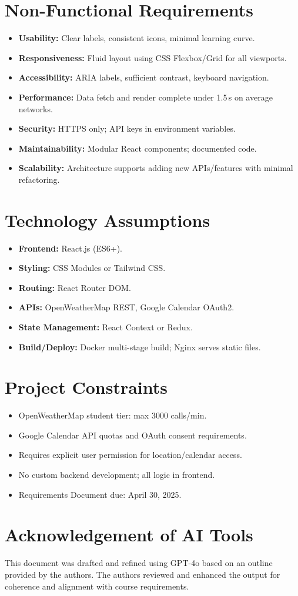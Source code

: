 \documentclass[12pt,a4paper]{article}
\begin{document}
\section{Non-Functional Requirements}
\begin{itemize}[nosep]
  \item \textbf{Usability:} Clear labels, consistent icons, minimal learning curve.
  \item \textbf{Responsiveness:} Fluid layout using CSS Flexbox/Grid for all viewports.
  \item \textbf{Accessibility:} ARIA labels, sufficient contrast, keyboard navigation.
  \item \textbf{Performance:} Data fetch and render complete under 1.5\,s on average networks.
  \item \textbf{Security:} HTTPS only; API keys in environment variables.
  \item \textbf{Maintainability:} Modular React components; documented code.
  \item \textbf{Scalability:} Architecture supports adding new APIs/features with minimal refactoring.
\end{itemize}

\section{Technology Assumptions}
\begin{itemize}[nosep]
  \item \textbf{Frontend:} React.js (ES6+).
  \item \textbf{Styling:} CSS Modules or Tailwind CSS.
  \item \textbf{Routing:} React Router DOM.
  \item \textbf{APIs:} OpenWeatherMap REST, Google Calendar OAuth2.
  \item \textbf{State Management:} React Context or Redux.
  \item \textbf{Build/Deploy:} Docker multi-stage build; Nginx serves static files.
\end{itemize}

\section{Project Constraints}
\begin{itemize}[nosep]
  \item OpenWeatherMap student tier: max 3000 calls/min.
  \item Google Calendar API quotas and OAuth consent requirements.
  \item Requires explicit user permission for location/calendar access.
  \item No custom backend development; all logic in frontend.
  \item Requirements Document due: April 30, 2025.
\end{itemize}

\section{Acknowledgement of AI Tools}
This document was drafted and refined using GPT-4o based on an outline provided by the authors. The authors reviewed and enhanced the output for coherence and alignment with course requirements.
\end{document}
